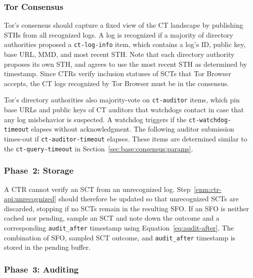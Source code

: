 \subsubsection{Tor Consensus}
Tor's consensus should capture a fixed view of the CT landscape by publishing
STHs from all recognized logs.  A log is recognized if a majority of directory
authorities proposed a \texttt{ct-log-info} item, which contains a log's ID,
public key, base URL, MMD, and most recent STH.  Note that each directory
authority proposes its own STH, and agrees to use the most recent STH as
determined by timestamp.  Since CTRs verify inclusion statuses of SCTs
that Tor Browser accepts, the CT logs recognized by Tor Browser must be in
the consensus.

Tor's directory authorities also majority-vote on \texttt{ct-auditor} items,
which pin base URLs and public keys of CT auditors that watchdogs contact in
case that any log misbehavior is suspected.  A watchdog triggers if the
\texttt{ct-watchdog-timeout} elapses without acknowledgment.  The following
auditor submission times-out if \texttt{ct-auditor-timeout} elapses.  These
items are determined similar to the \texttt{ct-query-timeout} in
Section~\ref{sec:base:consensus:params}.

\subsubsection{Phase~2: Storage}
A CTR cannot verify an SCT from an unrecognized log.
Step~\ref{enm:ctr-api:unrecognized} should therefore be updated so that
unrecognized SCTs are discarded, stopping if no SCTs remain in the resulting
SFO.  If an SFO is neither cached nor pending, sample an SCT and note down the
outcome and a corresponding \texttt{audit\_after} timestamp using
Equation~\ref{eq:audit-after}.  The combination of SFO, sampled SCT outcome, and
\texttt{audit\_after} timestamp is stored in the pending buffer.

\subsubsection{Phase~3: Auditing}

%
%
%
%

